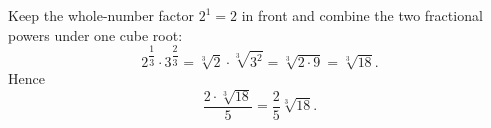Keep the whole-number factor $2^1=2$ in front and combine the two fractional powers under one cube root:
\[
2^{\dfrac{1}{3}}\cdot3^{\dfrac{2}{3}}=\sqrt[3]{2}\cdot\sqrt[3]{3^2}=\sqrt[3]{2\cdot9}=\sqrt[3]{18}.
\]
Hence
\[
\dfrac{2\cdot\sqrt[3]{18}}{5}=\boxed{\dfrac{2}{5}\sqrt[3]{18}}.
\]
